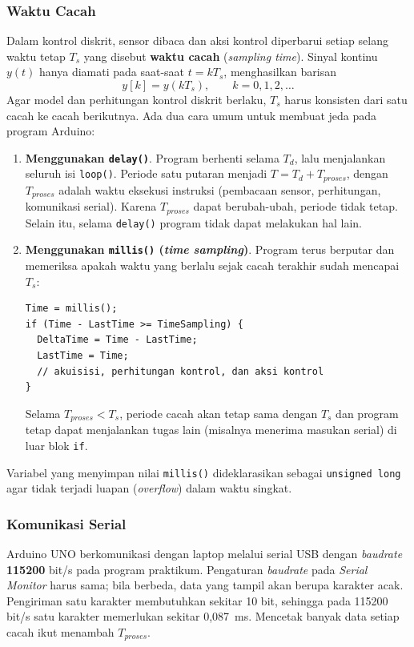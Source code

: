 \documentclass[11pt,a4paper]{article}
\begin{document}
\subsubsection{Waktu Cacah}
Dalam kontrol diskrit, sensor dibaca dan aksi kontrol diperbarui setiap selang waktu tetap $T_s$ yang disebut \textbf{waktu cacah} (\textit{sampling time}). Sinyal kontinu $y(t)$ hanya diamati pada saat-saat $t = kT_s$, menghasilkan barisan
\begin{equation}
	y[k] = y(kT_s), \qquad k = 0, 1, 2, \ldots
	\label{eq:cacah}
\end{equation}
Agar model dan perhitungan kontrol diskrit berlaku, $T_s$ harus konsisten dari satu cacah ke cacah berikutnya. Ada dua cara umum untuk membuat jeda pada program Arduino:
\begin{enumerate}
	\item \textbf{Menggunakan \texttt{delay()}}. Program berhenti selama $T_d$, lalu menjalankan seluruh isi \texttt{loop()}. Periode satu putaran menjadi $T = T_d + T_{proses}$, dengan $T_{proses}$ adalah waktu eksekusi instruksi (pembacaan sensor, perhitungan, komunikasi serial). Karena $T_{proses}$ dapat berubah-ubah, periode tidak tetap. Selain itu, selama \texttt{delay()} program tidak dapat melakukan hal lain.
	\item \textbf{Menggunakan \texttt{millis()} (\textit{time sampling})}. Program terus berputar dan memeriksa apakah waktu yang berlalu sejak cacah terakhir sudah mencapai $T_s$:
	      \begin{lstlisting}[numbers=none]
Time = millis();
if (Time - LastTime >= TimeSampling) {
  DeltaTime = Time - LastTime;
  LastTime = Time;
  // akuisisi, perhitungan kontrol, dan aksi kontrol
}\end{lstlisting}
	      Selama $T_{proses} < T_s$, periode cacah akan tetap sama dengan $T_s$ dan program tetap dapat menjalankan tugas lain (misalnya menerima masukan serial) di luar blok \texttt{if}.
\end{enumerate}
Variabel yang menyimpan nilai \texttt{millis()} dideklarasikan sebagai \texttt{unsigned long} agar tidak terjadi luapan (\textit{overflow}) dalam waktu singkat.

\subsubsection{Komunikasi Serial}
Arduino UNO berkomunikasi dengan laptop melalui serial USB dengan \textit{baudrate} \textbf{115200} bit/s pada program praktikum. Pengaturan \textit{baudrate} pada \textit{Serial Monitor} harus sama; bila berbeda, data yang tampil akan berupa karakter acak. Pengiriman satu karakter membutuhkan sekitar 10 bit, sehingga pada 115200 bit/s satu karakter memerlukan sekitar 0,087~ms. Mencetak banyak data setiap cacah ikut menambah $T_{proses}$.
\end{document}
